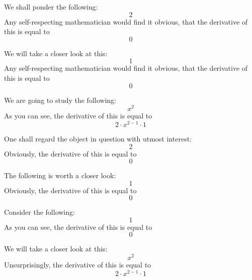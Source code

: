 \documentclass{article}
\begin{document}
We shall ponder the following:
\begin{equation}
2 
\end{equation}
Any self-respecting mathematician would find it obvious, that the derivative of this is equal to
\begin{equation}
0 
\end{equation}

We will take a closer look at this:
\begin{equation}
1 
\end{equation}
Any self-respecting mathematician would find it obvious, that the derivative of this is equal to
\begin{equation}
0 
\end{equation}

We are going to study the following:
\begin{equation}
x ^{2 } 
\end{equation}
As you can see, the derivative of this is equal to
\begin{equation}
2 \cdot x ^{2 - 1 } \cdot 1 
\end{equation}

One shall regard the object in question with utmost interest:
\begin{equation}
2 
\end{equation}
Obviously, the derivative of this is equal to
\begin{equation}
0 
\end{equation}

The following is worth a closer look:
\begin{equation}
1 
\end{equation}
Obviously, the derivative of this is equal to
\begin{equation}
0 
\end{equation}

Consider the following:
\begin{equation}
1 
\end{equation}
As you can see, the derivative of this is equal to
\begin{equation}
0 
\end{equation}

We will take a closer look at this:
\begin{equation}
x ^{2 } 
\end{equation}
Unsurprisingly, the derivative of this is equal to
\begin{equation}
2 \cdot x ^{2 - 1 } \cdot 1 
\end{equation}
\end{document}
